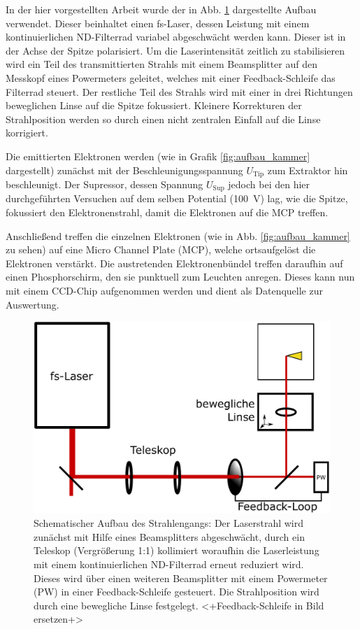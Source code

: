 \documentclass[bachelor,       %
               twoside,        %
               BCOR10mm,       %
               english,ngerman, %
               ]{GAUBM}
\begin{document}
In der hier vorgestellten Arbeit wurde der in Abb. \ref{fig:aufbau} dargestellte Aufbau verwendet.
Dieser beinhaltet einen fs-Laser, dessen Leistung mit einem kontinuierlichen ND-Filterrad variabel abgeschwächt werden kann.
Dieser ist in der Achse der Spitze polarisiert.
Um die Laserintensit\"at zeitlich zu stabilisieren wird ein Teil des transmittierten Strahls mit einem Beamsplitter auf den Messkopf eines Powermeters geleitet, welches mit einer Feedback-Schleife das Filterrad steuert.
Der restliche Teil des Strahls wird mit einer in drei Richtungen beweglichen Linse auf die Spitze fokussiert.
Kleinere Korrekturen der Strahlposition werden so durch einen nicht zentralen Einfall auf die Linse korrigiert.


Die emittierten Elektronen werden (wie in Grafik \ref{fig:aufbau_kammer} dargestellt) zunächst mit der Beschleunigungsspannung $U_\text{Tip}$ zum Extraktor hin beschleunigt.
Der Supressor, dessen Spannung $U_\text{Sup}$ jedoch bei den hier durchgeführten Versuchen auf dem selben Potential (\SI{100}{\V}) lag, wie die Spitze, fokussiert den Elektronenstrahl, damit die Elektronen auf die MCP treffen.\newline\newline

Anschließend treffen die einzelnen Elektronen (wie in Abb. \ref{fig:aufbau_kammer} zu sehen) auf eine Micro Channel Plate (MCP), welche ortsaufgelöst die Elektronen verstärkt.
Die austretenden Elektronenb\"undel treffen daraufhin auf einen Phosphorschirm, den sie punktuell zum Leuchten anregen.
Dieses kann nun mit einem CCD-Chip aufgenommen werden und dient als Datenquelle zur Auswertung.


\begin{figure}[h!]
	\centering
	\includegraphics[width=0.8\linewidth]{Aufbau2}
	\caption{Schematischer Aufbau des Strahlengangs: Der Laserstrahl wird zunächst mit Hilfe eines Beamsplitters abgeschwächt, durch ein Teleskop (Vergrößerung 1:1)  kollimiert woraufhin die Laserleistung mit einem kontinuierlichen ND-Filterrad erneut reduziert wird. Dieses wird über einen weiteren Beamsplitter mit einem Powermeter (PW) in einer Feedback-Schleife gesteuert. Die Strahlposition wird durch eine bewegliche Linse festgelegt. <+Feedback-Schleife in Bild ersetzen+>}
	\label{fig:aufbau}
\end{figure}
\end{document}
